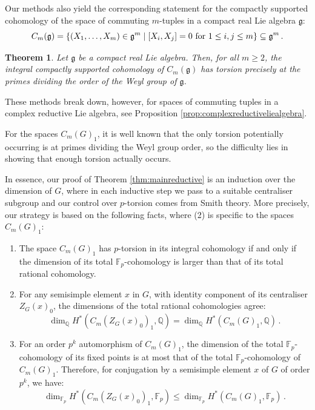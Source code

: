 \documentclass[oneside, 12pt, a4paper]{amsart}
\numberwithin{equation}{section}
\newcommand{\F}{\mathbb{F}}
\newcommand{\Q}{\mathbb{Q}}
\theoremstyle{plain}
\newtheorem{theorem}{Theorem}[section]
\theoremstyle{definition}
\theoremstyle{remark}
\begin{document}
Our methods also yield the corresponding statement for the compactly supported cohomology of the space of commuting $m$-tuples in a compact real Lie algebra $\mathfrak{g}$:
\[C_m(\mathfrak{g})=\{(X_1,\dots,X_m)\in \mathfrak{g}^m\mid [X_i,X_j]=0 \textnormal{ for } 1\leq i,j\leq m\}\subseteq \mathfrak{g}^m\, .\]

\begin{theorem} \label{thm:mainliealgebra}
Let $\mathfrak{g}$ be a compact real Lie algebra. Then, for all $m\geq 2$, the integral compactly supported cohomology of $C_m(\mathfrak{g})$ has torsion precisely at the primes dividing the order of the Weyl group of $\mathfrak{g}$.
\end{theorem}

These methods break down, however, for spaces of commuting tuples in a complex reductive Lie algebra, see Proposition \ref{prop:complexreductiveliealgebra}.

For the spaces $C_m(G)_1$, it is well known that the only torsion potentially occurring is at primes dividing the Weyl group order, so the difficulty lies in showing that enough torsion actually occurs.

In essence, our proof of Theorem \ref{thm:mainreductive} is an induction over the dimension of $G$, where in each inductive step we pass to a suitable centraliser subgroup and our control over $p$-torsion comes from Smith theory. More precisely, our strategy is based on the following facts, where (2) is specific to the spaces $C_m(G)_1$:

\begin{enumerate}
    \item The space $C_m(G)_1$ has $p$-torsion in its integral cohomology if and only if the dimension of its total $\F_p$-cohomology is larger than that of its total rational cohomology.
    \item For any semisimple element $x$ in $G$, with identity component of its centraliser $Z_G(x)_0$, the dimensions of the total rational cohomologies agree:
    \[\dim_\Q H^*(C_m(Z_G(x)_0)_1,\Q)=\dim_\Q H^*(C_m(G)_1,\Q)\, .\]
    
    \item For an order $p^k$ automorphism of $C_m(G)_1$, the dimension of the total $\F_p$-cohomology of its fixed points is at most that of the total $\F_p$-cohomology of $C_m(G)_1$. Therefore, for conjugation by a semisimple element $x$ of $G$ of order $p^k$, we have: 
    \[\dim_{\F_p}H^*(C_m(Z_G(x)_0)_1,\F_p)\leq \dim_{\F_p} H^*(C_m(G)_1,\F_p)\, .\]
\end{enumerate}
\end{document}
